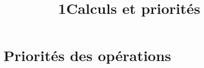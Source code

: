 \documentclass[14pt,a4paper]{extarticle}
\date{}
\title{\textcircled{{\normalsize{1}}}Calculs et priorités}
\begin{document}
\maketitle



\vspace*{-0.5cm}

\vspace*{-0.5cm}

\section{Priorités des opérations}

%
%
%	
%		
%		
%		
%	
%		
\end{document}
